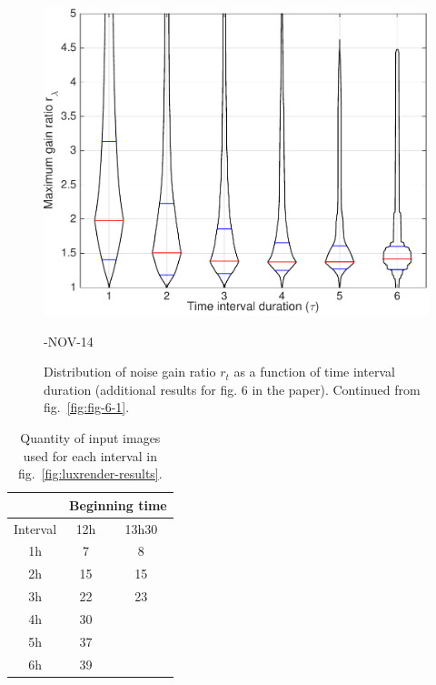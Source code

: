 \begin{figure}
\includegraphics[width=\mylength]{dist/20141114-maxGain-local-relativePerf} \\
\parbox{\mylength}{-NOV-14}
\caption{Distribution of noise gain ratio $r_t$ as a function of time interval duration (additional results for fig. 6 in the paper). Continued from fig.~\ref{fig:fig-6-1}.}
\label{fig:fig-6-2}
\end{figure}


\FloatBarrier
\begin{table}
\centering
\begin{tabular}{|c|c|c|} \hline
 & \multicolumn{2}{|c|}{Beginning time} \\ \hline
Interval & 12h & 13h30 \\ \hline \hline
1h & 7 & 8 \\ \hline
2h & 15 & 15 \\ \hline
3h & 22 & 23 \\ \hline
4h & 30 &  \\ \hline
5h & 37 &  \\ \hline
6h & 39 &  \\ \hline
\end{tabular}
\vspace{.5em}
\caption{Quantity of input images used for each interval in fig.~\ref{fig:luxrender-results}.}
\label{tab:luxrender-qty-input}
\end{table}


